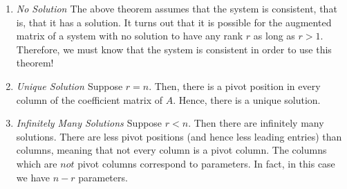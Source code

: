 \begin{enumerate}
\item {\em No Solution \em}
The above theorem assumes that the system is consistent, that is, that it has a solution. It turns out that it is possible for the 
augmented matrix of a system with no solution to have any rank $r$ as long as $r>1$. Therefore, we must know 
that the system is consistent in order to use this theorem!   

\item {\em Unique Solution \em}
Suppose $r=n$. Then, there is a pivot position in every column of the coefficient matrix of $A$. Hence, there is a unique solution.

\item {\em Infinitely Many Solutions \em}
Suppose $r<n$. Then there are infinitely many solutions. There are less pivot positions (and hence less leading entries) than columns, meaning that not every column is a pivot column. The columns which are $not$ pivot columns correspond to parameters. In fact,
in this case we have $n-r$ parameters.
\end{enumerate}
